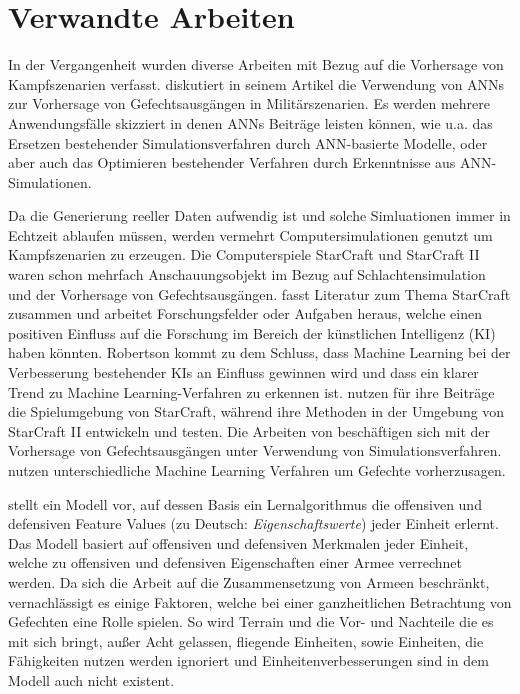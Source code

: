 \section{Verwandte Arbeiten}
\label{VerwandteArbeiten}

In der Vergangenheit wurden diverse Arbeiten mit Bezug auf die Vorhersage von Kampfszenarien verfasst. \textcite{Kilmer.1996} diskutiert in seinem Artikel die Verwendung von ANNs zur Vorhersage von Gefechtsausgängen in Militärszenarien. Es werden mehrere Anwendungsfälle skizziert in denen ANNs Beiträge leisten können, wie u.a. das Ersetzen bestehender Simulationsverfahren durch ANN-basierte Modelle, oder aber auch das Optimieren bestehender Verfahren durch Erkenntnisse aus ANN-Simulationen.  

Da die Generierung reeller Daten aufwendig ist und solche Simluationen immer in Echtzeit ablaufen müssen, werden vermehrt Computersimulationen genutzt um Kampfszenarien zu erzeugen. Die Computerspiele StarCraft und StarCraft II waren schon mehrfach Anschauungsobjekt im Bezug auf Schlachtensimulation und der Vorhersage von Gefechtsausgängen. \textcite{AAAI:aimag/Robertson14} fasst Literatur zum Thema StarCraft zusammen und arbeitet Forschungsfelder oder Aufgaben heraus, welche einen positiven Einfluss auf die Forschung im Bereich der künstlichen Intelligenz (KI) haben könnten. Robertson kommt zu dem Schluss, dass Machine Learning bei der Verbesserung bestehender KIs an Einfluss gewinnen wird und dass ein klarer Trend zu Machine Learning-Verfahren zu erkennen ist. 
\textcite{AIIDE137381, AIIDE125469, AIIDE1511531, SnchezRuizGranados2015PredictingTO, 6633643, 6374183} nutzen für ihre Beiträge die Spielumgebung von StarCraft, während \textcite{DBLP:journals/corr/HelmkeKW14, samvelyan2019starcraft} ihre Methoden in der Umgebung von StarCraft II entwickeln und testen. Die Arbeiten von  \textcite{6633643, AIIDE125469, DBLP:journals/corr/HelmkeKW14} beschäftigen sich mit der Vorhersage von Gefechtsausgängen unter Verwendung von Simulationsverfahren. \textcite{SnchezRuizGranados2015PredictingTO, AIIDE137381, AIIDE1511531} nutzen unterschiedliche Machine Learning Verfahren um Gefechte vorherzusagen. 

\textcite{AIIDE137381} stellt ein Modell vor, auf dessen Basis ein Lernalgorithmus die offensiven und defensiven Feature Values (zu Deutsch: \textit{Eigenschaftswerte}) jeder Einheit erlernt. Das Modell basiert auf offensiven und defensiven Merkmalen jeder Einheit, welche zu offensiven und defensiven Eigenschaften einer Armee verrechnet werden. Da sich die Arbeit auf die Zusammensetzung von Armeen beschränkt, vernachlässigt es einige Faktoren, welche bei einer ganzheitlichen Betrachtung von Gefechten eine Rolle spielen. So wird Terrain und die Vor- und Nachteile die es mit sich bringt, außer Acht gelassen, fliegende Einheiten, sowie Einheiten, die Fähigkeiten nutzen werden ignoriert und Einheitenverbesserungen sind in dem Modell auch nicht existent. 

